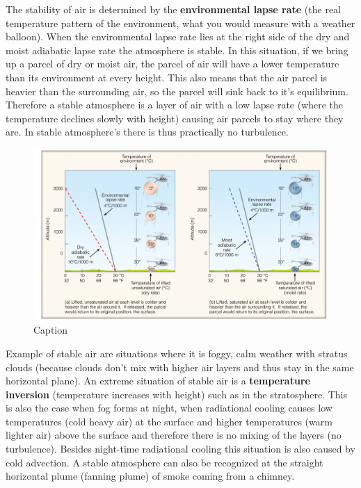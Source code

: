 \documentclass[12pt,oneside]{book}
\begin{document}
The stability of air is determined by the \textbf{environmental lapse
rate} (the real temperature pattern of the environment, what you would
measure with a weather balloon). When the environmental lapse rate lies
at the right side of the dry and moist adiabatic lapse rate the
atmosphere is stable. In this situation, if we bring up a parcel of dry
or moist air, the parcel of air will have a lower temperature than its
environment at every height. This also means that the air parcel is
heavier than the surrounding air, so the parcel will sink back to it's
equilibrium. Therefore a stable atmosphere is a layer of air with a low
lapse rate (where the temperature declines slowly with height) causing
air parcels to stay where they are. In stable atmosphere's there is thus
practically no turbulence.

\begin{figure}

{\centering \includegraphics[width=1\linewidth]{figures/Figure33} 

}

\caption{Caption}\label{fig:Turbulence}
\end{figure}

Example of stable air are situations where it is foggy, calm weather
with stratus clouds (because clouds don't mix with higher air layers and
thus stay in the same horizontal plane). An extreme situation of stable
air is a \textbf{temperature inversion} (temperature increases with
height) such as in the stratosphere. This is also the case when fog
forms at night, when radiational cooling causes low temperatures (cold
heavy air) at the surface and higher temperatures (warm lighter air)
above the surface and therefore there is no mixing of the layers (no
turbulence). Besides night-time radiational cooling this situation is
also caused by cold advection. A stable atmosphere can also be
recognized at the straight horizontal plume (fanning plume) of smoke
coming from a chimney.
\end{document}
